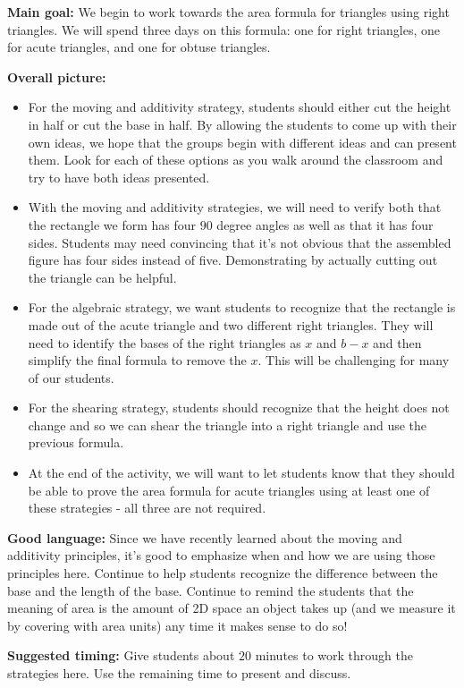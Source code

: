 \documentclass[nooutcomes,noauthor]{ximera}
\begin{document}
\newpage

\begin{instructorNotes} 

{\bf Main goal:} We begin to work towards the area formula for triangles using right triangles. We will spend three days on this formula: one for right triangles, one for acute triangles, and one for obtuse triangles.

{\bf Overall picture:} 
\begin{itemize}
	\item For the moving and additivity strategy, students should either cut the height in half or cut the base in half.  By allowing the students to come up with their own ideas, we hope that the groups begin with different ideas and can present them. Look for each of these options as you walk around the classroom and try to have both ideas presented.
	\item With the moving and additivity strategies, we will need to verify both that the rectangle we form has four $90$ degree angles as well as that it has four sides. Students may need convincing that it's not obvious that the assembled figure has four sides instead of five. Demonstrating by actually cutting out the triangle can be helpful.
	\item For the algebraic strategy, we want students to recognize that the rectangle is made out of the acute triangle and two different right triangles. They will need to identify the bases of the right triangles as $x$ and $b-x$ and then simplify the final formula to remove the $x$. This will be challenging for many of our students.
	\item For the shearing strategy, students should recognize that the height does not change and so we can shear the triangle into a right triangle and use the previous formula. 
	\item At the end of the activity, we will want to let students know that they should be able to prove the area formula for acute triangles using at least one of these strategies - all three are not required.
\end{itemize}


{\bf Good language:} Since we have recently learned about the moving and additivity principles, it's good to emphasize when and how we are using those principles here. Continue to help students recognize the difference between the base and the length of the base. Continue to remind the students that the meaning of area is the amount of 2D space an object takes up (and we measure it by covering with area units) any time it makes sense to do so!



{\bf Suggested timing:} Give students about $20$ minutes to work through the strategies here. Use the remaining time to present and discuss.



\end{instructorNotes}
\end{document}
